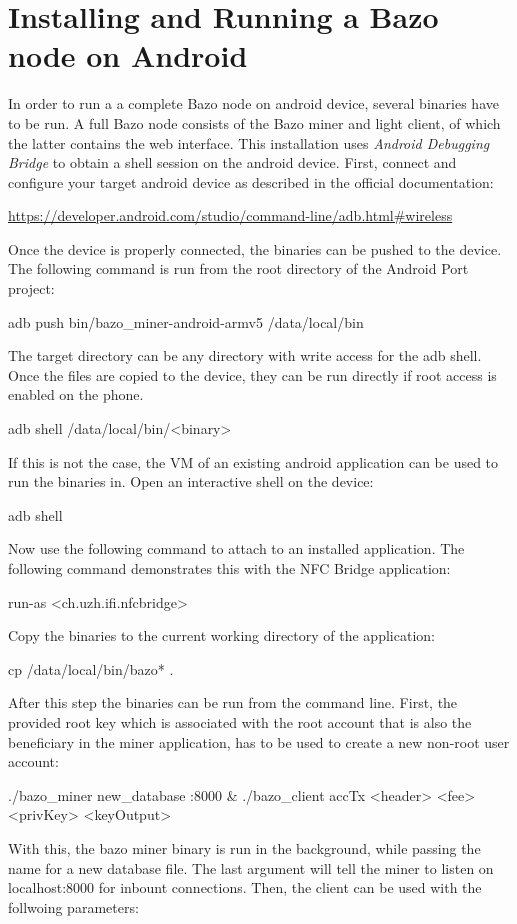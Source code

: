 \section{Installing and Running a Bazo node on Android}\label{bazoandroid}
In order to run a a complete Bazo node on android device, several binaries have to be run. A full Bazo node consists of the Bazo miner and light client, of which the latter contains the web interface.
This installation uses \textit{Android Debugging Bridge} to obtain a shell session on the android device. First, connect and configure your target android device as described in the official documentation:
\begin{framed}\url{https://developer.android.com/studio/command-line/adb.html#wireless}
\end{framed}
Once the device is properly connected, the binaries can be pushed to the device. The following command is run from the root directory of the Android Port project:
\begin{framed}adb push bin/bazo\_miner-android-armv5 /data/local/bin\end{framed}
The target directory can be any directory with write access for the adb shell. Once the files are copied to the device, they can be run directly if root access is enabled on the phone.
\begin{framed}adb shell /data/local/bin/<binary>\end{framed}
If this is not the case, the VM of an existing android application can be used to run the binaries in. Open an interactive shell on the device:
\begin{framed}adb shell\end{framed}
Now use the following command to attach to an installed application. The following command demonstrates this with the NFC Bridge application:
\begin{framed}run-as <ch.uzh.ifi.nfcbridge>\end{framed}
Copy the binaries to the current working directory of the application:
\begin{framed}cp /data/local/bin/bazo* .\end{framed}
After this step the binaries can be run from the command line. 
First, the provided root key which is associated with the root account that is also the beneficiary in the miner application, has to be used to create a new non-root user account:
\begin{framed}./bazo\_miner new\_database :8000 \&
./bazo\_client accTx <header> <fee> <privKey> <keyOutput>
\end{framed}
With this, the bazo miner binary is run in the background, while passing the name for a new database file. The last argument will tell the miner to listen on localhost:8000 for inbount connections. Then, the client can be used with the follwoing parameters:

